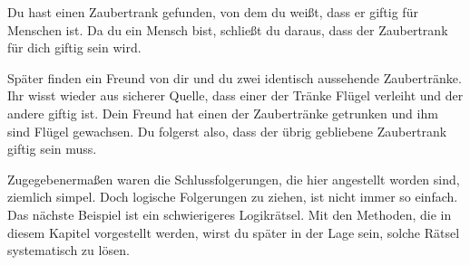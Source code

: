 \documentclass[../../main.tex]{subfiles}
\begin{document}
    
    \begin{example}{}
        Du hast einen Zaubertrank gefunden, von dem du weißt, dass er giftig für Menschen ist. Da du ein Mensch bist, schließt du daraus, dass der Zaubertrank für dich giftig sein wird.
        
        Später finden ein Freund von dir und du zwei identisch aussehende Zaubertränke. Ihr wisst wieder aus sicherer Quelle, dass einer der Tränke Flügel verleiht und der andere giftig ist. Dein Freund hat einen der Zaubertränke getrunken und ihm sind Flügel gewachsen. Du folgerst also, dass der übrig gebliebene Zaubertrank giftig sein muss.
    \end{example}
    

    Zugegebenermaßen waren die Schlussfolgerungen, die hier angestellt worden sind, ziemlich simpel. Doch logische Folgerungen zu ziehen, ist nicht immer so einfach. Das nächste Beispiel ist ein schwierigeres Logikrätsel. Mit den Methoden, die in diesem Kapitel vorgestellt werden, wirst du später in der Lage sein, solche Rätsel systematisch zu lösen.
    
\end{document}
